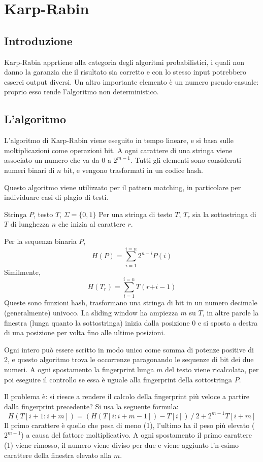 \section{Karp-Rabin}

\subsection{Introduzione}
Karp-Rabin apprtiene alla categoria degli algoritmi probabilistici, i quali non danno la garanzia che il risultato sia corretto e con lo stesso input potrebbero esserci output diversi. Un altro importante elemento è un numero pseudo-casuale: proprio esso rende l'algoritmo non deterministico.

\subsection{L'algoritmo}
L'algoritmo di Karp-Rabin viene eseguito in tempo lineare, e si basa sulle moltiplicazioni come operazioni bit. A ogni carattere di una stringa viene associato un numero che va da $0$ a $2^{m-1}$. Tutti gli elementi sono considerati numeri binari di $n$ bit, e vengono trasformati in un codice hash. 

Questo algoritmo viene utilizzato per il pattern matching, in particolare per individuare casi di plagio di testi.

Stringa $P$, testo $T$, $\Sigma = \{0, 1\}$
Per una stringa di testo $T$, $T_r$ sia la sottostringa di $T$ di lunghezza $n$ che inizia al carattere $r$.

Per la sequenza binaria $P$,
$$H(P) = \sum_{i=1}^{i=n}2^{n-i}P(i)$$
Similmente,
$$H(T_r) = \sum_{i=1}^{i=n}T(r +^{} i - 1)$$
Queste sono funzioni hash, trasformano una stringa di bit in un numero decimale (generalmente) univoco. La sliding window ha ampiezza $m$ su $T$, in altre parole la finestra (lunga quanto la sottostringa) inizia dalla posizione 0 e si sposta a destra di una posizione per volta fino alle ultime posizioni. 

Ogni intero può essere scritto in modo unico come somma di potenze positive di 2, e questo algoritmo trova le occorrenze paragonando le sequenze di bit dei due numeri. 
A ogni spostamento la fingerprint lunga $m$ del testo viene ricalcolata, per poi eseguire il controllo se essa è uguale alla fingerprint della sottostringa $P$. 

Il problema è: si riesce a rendere il calcolo della fingerprint più veloce a partire dalla fingerprint precedente? Si usa la seguente formula:
$$H(T[i + 1 : i + m]) = (H(T[i : i + m - 1]) - T[i])\ /\ 2 + 2^{m - 1}T[i + m]$$
Il primo carattere è quello che pesa di meno (1), l'ultimo ha il peso più elevato ($2^{m-1}$) a causa del fattore moltiplicativo. A ogni spostamento il primo carattere (1) viene rimosso, il numero viene diviso per due e viene aggiunto l'n-esimo carattere della finestra elevato alla $m$.

